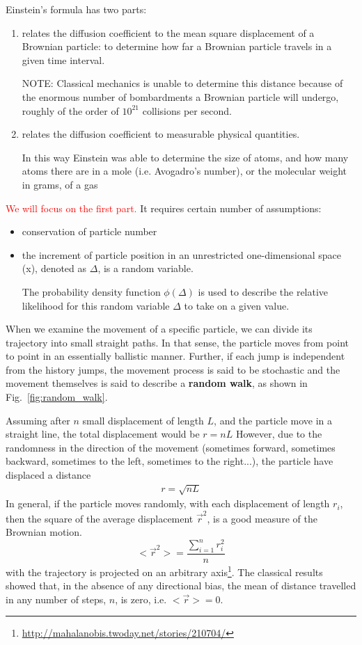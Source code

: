Einstein's formula has two parts:
\begin{enumerate}
  \item relates the diffusion coefficient to the mean
square displacement of a Brownian particle: to determine how far a Brownian
particle travels in a given time interval.

NOTE: Classical mechanics is unable to determine this distance because of the
enormous number of bombardments a Brownian particle will undergo, roughly of the
order of $10^{21}$ collisions per second.
  
  \item relates the diffusion coefficient to measurable physical quantities.
  
In this way Einstein was able to determine the size of atoms, and how many atoms
there are in a mole (i.e. Avogadro's number), or the molecular weight in grams,
of a gas
\end{enumerate}
\textcolor{red}{We will focus on the first part.}
It requires certain number of assumptions:
\begin{itemize}
  \item conservation of particle number
  \item the increment of particle position in an unrestricted one-dimensional
  space (x), denoted as $\Delta$, is a random variable.
  
The probability density function $\phi(\Delta)$ is used to describe the relative
likelihood for this random variable $\Delta$ to take on a given value.

\end{itemize}


When we examine the movement of a specific particle, we can divide its
trajectory into small straight paths. In that sense, the particle
moves from point to point in an essentially ballistic manner. Further,
if each jump is independent from the history jumps, the movement
process is said to be stochastic and the movement themselves is said
to describe a {\bf random walk}, as shown in
Fig.~\ref{fig:random_walk}.  

Assuming after $n$ small displacement of length $L$, and the particle
move in a straight line, the total displacement would be $r=nL$
However, due to the randomness in the direction of the movement
(sometimes forward, sometimes backward, sometimes to the left,
sometimes to the right...), the particle have displaced a distance
\begin{eqnarray}
  \label{eq:237}
  r = \sqrt{nL}
\end{eqnarray}
In general, if the particle moves randomly, with each displacement of
length $r_i$, then the square of the average displacement $\vec{r}^2$,
is a good measure of the Brownian motion.
\begin{equation}
  \label{eq:70}
  <\overrightarrow r^2> = \frac{\sum_{i=1}^n r_i^2}{n}
\end{equation}
with the trajectory is projected on an arbitrary
axis\footnote{\url{http://mahalanobis.twoday.net/stories/210704/}}. The
classical results showed that, in the absence of any directional bias,
the mean of distance travelled in any number of steps, $n$, is zero,
i.e. $<\overrightarrow{r}> = 0$.



